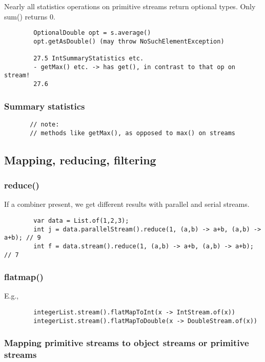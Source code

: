 \documentclass{scrartcl}
\begin{document}
    Nearly all statistics operations on primitive streams return optional types.
    Only sum() returns 0.

    \begin{lstlisting}
        OptionalDouble opt = s.average()
        opt.getAsDouble() (may throw NoSuchElementException)

        27.5 IntSummaryStatistics etc.
        - getMax() etc. -> has get(), in contrast to that op on stream!
        27.6
    \end{lstlisting}

\subsubsection{Summary statistics}

    \begin{lstlisting}
       // note:
       // methods like getMax(), as opposed to max() on streams
    \end{lstlisting}

\subsection{Mapping, reducing, filtering}
\subsubsection{reduce()}

    If a combiner present, we get different results with parallel and serial streams.

    \begin{lstlisting}
        var data = List.of(1,2,3);
        int j = data.parallelStream().reduce(1, (a,b) -> a+b, (a,b) -> a+b); // 9
        int f = data.stream().reduce(1, (a,b) -> a+b, (a,b) -> a+b); // 7
    \end{lstlisting}

\subsubsection{flatmap()}

    E.g.,

    \begin{lstlisting}
        integerList.stream().flatMapToInt(x -> IntStream.of(x))
        integerList.stream().flatMapToDouble(x -> DoubleStream.of(x))
    \end{lstlisting}

\subsubsection{Mapping primitive streams to object streams or primitive streams}
\end{document}
